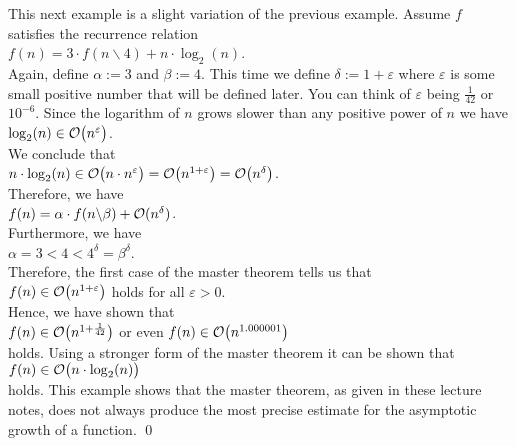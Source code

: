 \example
This next example is a slight variation of the previous example.  Assume $f$ satisfies the recurrence relation 
\\[0.2cm]
\hspace*{1.3cm}
$f(n) = 3 \cdot f(n \backslash 4) + n \cdot \log_2(n)$.
\\[0.2cm]
Again, define $\alpha := 3$ and $\beta := 4$.  This time we define $\delta := 1 + \varepsilon$ where
$\varepsilon$ is some small positive number that will be defined later.  You can think of $\varepsilon$ being 
 $\frac{1}{42}$ or $10^{-6}$.  Since the logarithm of $n$ grows slower than any positive power of $n$ we have
\\[0.2cm]
\hspace*{1.3cm}
$\log_2(n) \in \mathcal{O}\bigl(n^\varepsilon\bigr)$.
\\[0.2cm]
We conclude that
\\[0.2cm]
\hspace*{1.3cm}
$n \cdot \log_2(n) \in \mathcal{O}\bigl(n \cdot n^\varepsilon\bigr) = \mathcal{O}\bigl(n^{1+\varepsilon}\bigr) = \mathcal{O}\bigl(n^\delta\bigr)$.
\\[0.2cm]
Therefore, we have
\\[0.2cm]
\hspace*{1.3cm}
$f(n) = \alpha \cdot f(n \backslash \beta) + \mathcal{O}(n^\delta)$.
\\[0.2cm]
Furthermore, we have
\\[0.2cm]
\hspace*{1.3cm}
$\alpha = 3 < 4 < 4^\delta = \beta^\delta$.
\\[0.2cm]
Therefore, the first case of the master theorem tells us that
\\[0.2cm]
\hspace*{1.3cm}
$f(n) \in \mathcal{O}\bigl(n^{1+\varepsilon}\bigr)$ \quad holds for all $\varepsilon > 0$.
\\[0.2cm]
Hence, we have shown that
\\[0.2cm]
\hspace*{1.3cm}
$f(n) \in \mathcal{O}\bigl(n^{1+\frac{1}{42}}\bigr)$ \quad or even \quad $f(n) \in \mathcal{O}\bigl(n^{1.000001}\bigr)$
\\[0.2cm]
holds.  Using a stronger form of the master theorem it can be shown that
\\[0.2cm]
\hspace*{1.3cm}
$f(n) \in \mathcal{O}\bigl(n \cdot \log_2(n)\bigr)$
\\[0.2cm]
holds.  This example shows that the master theorem, as given in these lecture notes, does not always
produce the most precise estimate for the asymptotic growth of a function.
\qed

